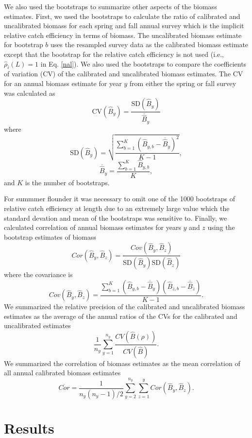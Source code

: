\documentclass[]{article}
\begin{document}
We also used the bootstraps to summarize other aspects of the biomass
estimates. First, we used the bootstraps to calculate the ratio of
calibrated and uncalibrated biomass for each spring and fall annual
survey which is the implicit relative catch efficiency in terms of
biomass. The uncalibrated biomass estimate for bootstrap \(b\) uses the
resampled survey data as the calibrated biomass estimate except that the
bootstrap for the relative catch efficiency is not used (i.e.,
\(\widehat \rho_i\left(L\right) = 1\) in Eq. \ref{nal}). We also used
the bootstraps to compare the coefficients of variation (CV) of the
calibrated and uncalibrated biomass estimates. The CV for an annual
biomass estimate for year \(y\) from either the spring or fall survey
was calculated as \[
\text{CV}\left(\widehat B_y\right) = \frac{\text{SD}\left(\widehat B_y\right)}{\overline{\widehat B}_y}
\] where \[
\text{SD}\left(\widehat B_y\right) = \sqrt{\frac{\sum_{b=1}^K \left(\widehat B_{y,b} - \overline{\widehat B}_y\right)^2}{K-1}},
\] \[
\overline{\widehat B}_y = \frac{\sum_{b=1}^K \widehat B_{y,b}}{K},
\] and \(K\) is the number of bootstraps.

For summmer flounder it was necessary to omit one of the 1000 bootstraps
of relative catch efficiency at length due to an extremely large value
which the standard devation and mean of the bootstraps was sensitive to.
Finally, we calculated correlation of annual biomass estimates for years
\(y\) and \(z\) using the bootstrap estimates of biomass \[
Cor\left(\widehat B_y, \widehat B_z\right) = \frac{Cov\left(\widehat B_y, \widehat B_z\right)}{\text{SD}\left(\widehat B_y\right)\text{SD}\left(\widehat B_z\right)}
\] where the covariance is \[
Cov\left(\widehat B_y, \widehat B_z\right) = \frac{\sum_{b=1}^K \left(\widehat B_{y,b} - \overline{\widehat B}_y\right)\left(\widehat B_{z,b} - \overline{\widehat B}_z\right)}{K-1}.
\] We summarized the relative precision of the calibrated and
uncalibrated biomass estimates as the average of the annual ratios of
the CVs for the calibrated and uncalibrated estimates \[
\frac{1}{n_y} \sum^{n_y}_{y = 1}\frac{CV\left(\widehat B\left(\rho\right)\right)}{CV\left(\widehat B\right)}.
\] We summarized the correlation of biomass estimates as the mean
correlation of all annual calibrated biomass estimates \[
\overline {Cor} = \frac{1}{n_y(n_y-1)/2} \sum_{y=2}^{n_y} \sum_{z=1}^{y} Cor\left(\widehat B_y, \widehat B_z\right).
\]

\hypertarget{results}{%
\section{Results}\label{results}}
\end{document}
